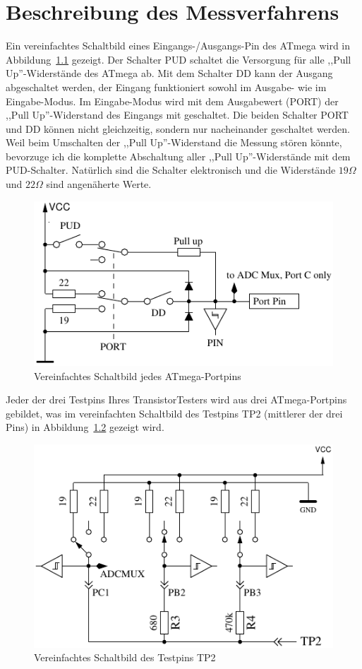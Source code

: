 \chapter{Beschreibung des Messverfahrens}
\label{sec:measurement}
Ein vereinfachtes Schaltbild eines Eingangs-/Ausgangs-Pin des ATmega wird in Abbildung~\ref{fig:port} gezeigt.
Der Schalter PUD schaltet die Versorgung für alle ,,Pull Up''-Widerstände des ATmega ab.
Mit dem Schalter DD kann der Ausgang abgeschaltet werden, der Eingang funktioniert sowohl im Ausgabe- wie im
Eingabe-Modus. Im Eingabe-Modus wird mit dem Ausgabewert (PORT) der ,,Pull Up''-Widerstand des Eingangs mit geschaltet.
Die beiden Schalter PORT und DD können nicht gleichzeitig, sondern nur nacheinander geschaltet werden.
Weil beim Umschalten der ,,Pull Up''-Widerstand die Messung stören könnte, bevorzuge ich die komplette
Abschaltung aller ,,Pull Up''-Widerstände mit dem PUD-Schalter.
Natürlich sind die Schalter elektronisch und die Widerstände \(19\Omega\) und \(22\Omega\) sind angenäherte Werte.
\begin{figure}[H]
\centering
\includegraphics[]{../FIG/port.pdf}
\caption{Vereinfachtes Schaltbild jedes ATmega-Portpins}
\label{fig:port}
\end{figure}

Jeder der drei Testpins Ihres TransistorTesters wird aus drei ATmega-Portpins gebildet,
was im vereinfachten Schaltbild des Testpins TP2 (mittlerer der drei Pins) in Abbildung~\ref{fig:terminal} gezeigt wird.

\begin{figure}[H]
\centering
\includegraphics[]{../FIG/terminal.pdf}
\caption{Vereinfachtes Schaltbild des Testpins TP2}
\label{fig:terminal}
\end{figure}

